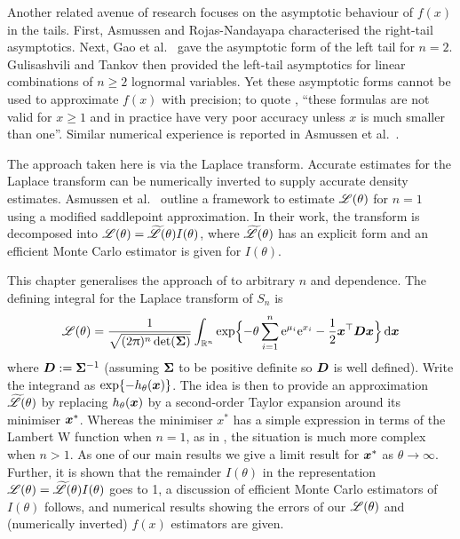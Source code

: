 Another related avenue of research focuses on the asymptotic behaviour of
$f(x)$ in the tails. First, Asmussen and Rojas-Nandayapa
\cite{asmussen2008asymptotics} characterised the right-tail asymptotics. Next,
Gao et al.\ \cite{gao2009asymptotic} gave the asymptotic form of the left tail
for $n=2$. Gulisashvili and Tankov \cite{tankov2015tail} then provided the
left-tail asymptotics for linear combinations of $n \geq 2$ lognormal
variables. Yet these asymptotic forms cannot be used to approximate $f(x)$
with precision; to quote \cite[p.\ 29]{tankov2015tail}, ``these formulas are
not valid for $x \geq 1$ and in practice have very poor accuracy unless $x$ is
much smaller than one''.  Similar numerical experience is reported in Asmussen
et al.\ \cite{asmussen2015exponential}.

The approach taken here is via the Laplace transform. Accurate estimates for
the Laplace transform can be numerically inverted to supply accurate density
estimates. Asmussen et al.\ \cite{asmussen2014laplace,asmussen2015exponential}
outline a framework to estimate $\mathscr{L}(\theta)$ for $n=1$ using a modified
saddlepoint approximation. In their work, the transform is decomposed into
$\mathscr{L}(\theta)=\widetilde{\mathscr{L}}(\theta)I(\theta)$, where
$\widetilde{\mathscr{L}}(\theta)$ has an explicit form and an efficient Monte
Carlo estimator is given for $I(\theta)$.

This chapter generalises the approach of
\cite{asmussen2014laplace,asmussen2015exponential} to arbitrary $n$ and
dependence.  The defining integral for the Laplace transform of $S_n$ is
\begin{equation} \label{laplace_def}
	\mathscr{L}(\theta) = \frac{1}{\sqrt{(2\uppi)^n \det(\bm{\Sigma})}} \int_{\mathbb{R}^n} \exp\Bigl\{ {-}\theta \sum_{i=1}^n \mathrm{e}^{\mu_i} \mathrm{e}^{x_i} -\frac12 \bm{x}^\top \bm{D} \bm{x} \Bigr\} \mathop{}\!\mathrm{d} \bm{x}
\end{equation}
where $\bm{D} := \bm{\Sigma}^{-1}$ (assuming $\bm{\Sigma}$ to be positive definite
so $\bm{D}$ is well defined).  Write the integrand as
$\exp\{-h_\theta(\bm{x})\}$. The idea is then to provide an approximation
$\widetilde{\mathscr{L}}(\theta)$ by replacing $h_\theta(\bm{x})$ by a second-order
Taylor expansion around its minimiser $\bm{x}^*$.  Whereas the minimiser $x^*$
has a simple expression in terms of the Lambert W function when $n=1$, as in
\cite{asmussen2014laplace,asmussen2015exponential}, the situation is much more
complex when $n>1$. As one of our main results we give a limit result for
$\bm{x}^*$ as $\theta\to\infty$.  Further, it is shown that the remainder
$I(\theta)$ in the representation
$\mathscr{L}(\theta)=\widetilde{\mathscr{L}}(\theta)I(\theta)$ goes to 1, a
discussion of efficient Monte Carlo estimators of $I(\theta)$ follows, and
numerical results showing the errors of our $\mathscr{L}(\theta)$ and
(numerically inverted) $f(x)$ estimators are given.


